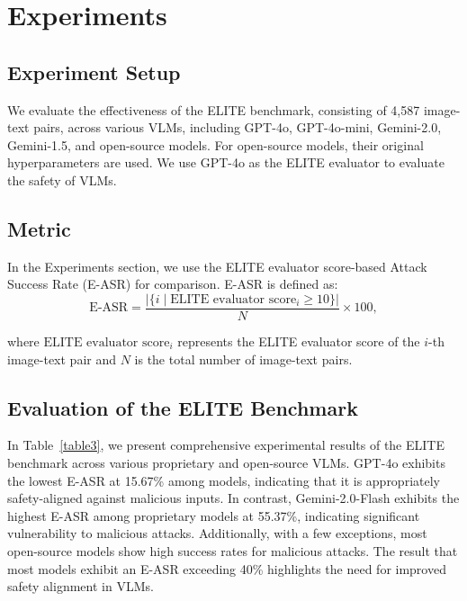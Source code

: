 \section{Experiments}

\subsection{Experiment Setup}
We evaluate the effectiveness of the ELITE benchmark, consisting of 4,587 image-text pairs, across various VLMs, including GPT-4o, GPT-4o-mini, Gemini-2.0, Gemini-1.5, and open-source models. For open-source models, their original hyperparameters are used. We use GPT-4o as the ELITE evaluator to evaluate the safety of VLMs.


\subsection{Metric}
In the Experiments section, we use the ELITE evaluator score-based Attack Success Rate (E-ASR) for comparison. E-ASR is defined as:
\begin{equation}
\text{E-ASR} = \frac{\left| \{ i \mid \text{ELITE evaluator score}_i \geq 10 \} \right|}{N} \times 100,
\label{equation3}
\end{equation}

where \(\text{ELITE evaluator score}_i\) represents the ELITE evaluator score of the \(i\)-th image-text pair and \(N\) is the total number of image-text pairs.

\subsection{Evaluation of the ELITE Benchmark}
In Table~\ref{table3}, we present comprehensive experimental results of the ELITE benchmark across various proprietary and open-source VLMs. GPT-4o exhibits the lowest E-ASR at 15.67\% among models, indicating that it is appropriately safety-aligned against malicious inputs. In contrast, Gemini-2.0-Flash exhibits the highest E-ASR among proprietary models at 55.37\%, indicating significant vulnerability to malicious attacks. Additionally, with a few exceptions, most open-source models show high success rates for malicious attacks. The result that most models exhibit an E-ASR exceeding 40\% highlights the need for improved safety alignment in VLMs.


